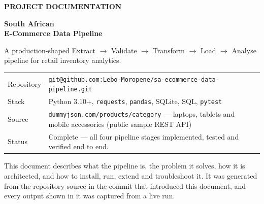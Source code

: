 \documentclass[10pt,a4paper]{article}
\newcommand{\cpath}[1]{\nolinkurl{#1}}
\begin{document}
\begin{titlepage}
\thispagestyle{empty}

\vspace*{4.6cm}

{\color{white}\fontsize{13}{16}\selectfont\bfseries\MakeUppercase{Project Documentation}\par}
\vspace{0.55cm}
{\color{white}\fontsize{33}{37}\selectfont\bfseries
South African\\[0.12cm]
E-Commerce Data Pipeline\par}
\vspace{0.7cm}
{\color{brandsoft}\fontsize{13.5}{19}\selectfont
A production-shaped Extract $\rightarrow$ Validate $\rightarrow$ Transform $\rightarrow$
Load $\rightarrow$ Analyse pipeline for retail inventory analytics.\par}

\vspace{6.0cm}

\noindent{\color{brand}\rule{\textwidth}{0.8pt}\par}
\vspace{0.5cm}

\noindent
\begin{tabularx}{\textwidth}{@{}L{3.1cm}Y@{}}
  \textcolor{muted}{Repository} &
  \cpath{git@github.com:Lebo-Moropene/sa-ecommerce-data-pipeline.git} \\[3pt]
  \textcolor{muted}{Stack} &
  Python 3.10+, \cpath{requests}, \cpath{pandas}, SQLite, SQL, \cpath{pytest} \\[3pt]
  \textcolor{muted}{Source} &
  \cpath{dummyjson.com/products/category} --- laptops, tablets and mobile
  accessories (public sample REST API) \\[3pt]
  \textcolor{muted}{Status} &
  Complete --- all four pipeline stages implemented, tested and verified end to end. \\
\end{tabularx}

\vfill

{\color{muted}\footnotesize
This document describes what the pipeline is, the problem it solves, how it is
architected, and how to install, run, extend and troubleshoot it.
It was generated from the repository source in the commit that introduced
this document, and every output shown in it was captured from a live run.}

\end{titlepage}
\end{document}
